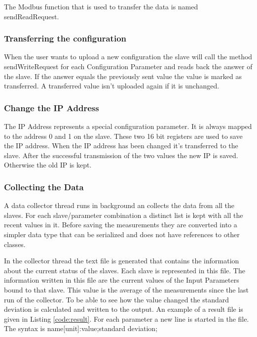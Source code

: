 The Modbus function that is used to transfer the data is named sendReadRequest.

\subsubsection{Transferring the configuration} %
\label{ssub:transferring_the_configuration}
When the user wants to upload a new configuration the slave will call the method sendWriteRequest for each Configuration Parameter and reads back the answer of the slave. If the answer equals the previously sent value the value is marked as transferred. A transferred value isn't uploaded again if it is unchanged.
\subsubsection{Change the IP Address} %
\label{ssub:change_the_ip_address}
The IP Address represents a special configuration parameter. It is always mapped to the address 0 and 1 on the slave. These two 16 bit registers are used to save the IP address. When the IP address has been changed it's transferred to the slave. After the successful transmission of the two values the new IP is saved. Otherwise the old IP is kept.


\subsubsection{Collecting the Data} %
\label{ssub:collecting_the_data}
A data collector thread runs in background an collects the data from all the slaves. For each slave/parameter combination a distinct list is kept with all the recent values in it. Before saving the measurements they are converted into a simpler data type that can be serialized and does not have references to other classes.

In the collector thread the text file is generated that contains the information about the current status of the slaves. Each slave is represented in this file. The information written in this file are the current values of the Input Parameters bound to that slave. This value is the average of the measurements since the last run of the collector. To be able to see how the value changed the standard deviation is calculated and written to the output. An example of a result file is given in Listing \ref{code:result}. 
For each parameter a new line is started in the file. The syntax is {\C name[unit]:value;standard deviation;}

